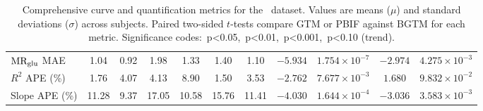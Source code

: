 \begin{sidewaystable}[b]
\begin{tabular}{l|cc|cc|cc|cc|cc}
		\(\text{MR}_{\text{glu}}\) MAE                   & 1.04                               & 0.92                              & 1.98                               & 1.33                                      & 1.40                                      & 1.10       & \(-5.934\) & \(1.754\times 10^{-7}\) \sym{***}  & \(-2.974\) & \(4.275\times 10^{-3}\) \sym{**}   \\
		\(R^2\) APE (\%)                 & 1.76                               & 4.07                              & 4.13                               & 8.90                                      & 1.50                                      & 3.53       & \(-2.762\) & \(7.677\times 10^{-3}\) \sym{**}   & \(1.680\)  & \(9.832\times 10^{-2}\)            \\
		Slope APE (\%)                   & 11.28                              & 9.37                              & 17.05                              & 10.58                                     & 15.76                                     & 11.41      & \(-4.030\) & \(1.644\times 10^{-4}\) \sym{***}  & \(-3.036\) & \(3.583\times 10^{-3}\) \sym{**}   \\
		\bottomrule
	\end{tabular}
	\caption{Comprehensive curve and quantification metrics for the \fdg\ dataset.
		Values are means (\(\mu\)) and standard deviations (\(\sigma\)) across subjects.
		Paired two-sided \(t\)-tests compare GTM or PBIF against BGTM for each metric.
		Significance codes: \sym{*}\,p<0.05, \sym{**}\,p<0.01, \sym{***}\,p<0.001, \sym{\dag}\,p<0.10 (trend).}

	\label{tab:metrics_all_fdg}
\end{sidewaystable}
